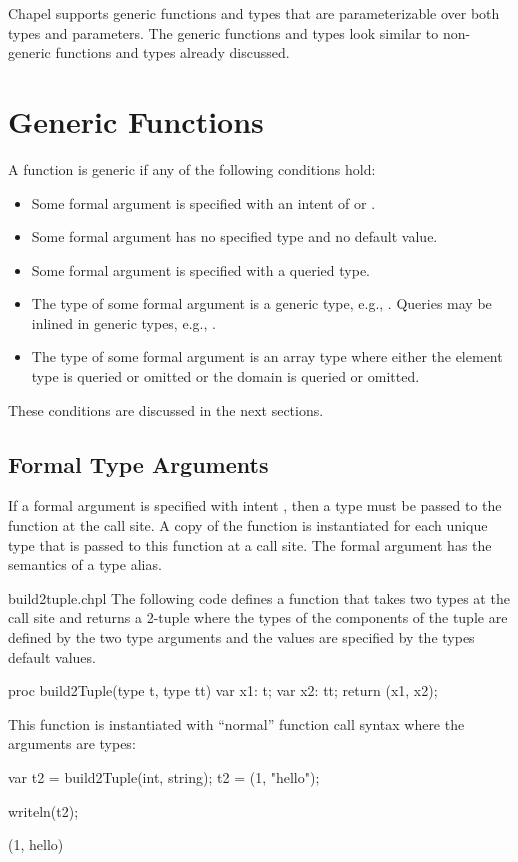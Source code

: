 \label{Generics}

Chapel supports generic functions and types that are parameterizable
over both types and parameters.  The generic functions and types look
similar to non-generic functions and types already discussed.

\section{Generic Functions}
\label{Generic_Functions}

A function is generic if any of the following conditions hold:
\begin{itemize}
\item
Some formal argument is specified with an intent of  or
.
\item
Some formal argument has no specified type and no default value.
\item
Some formal argument is specified with a queried type.
\item
The type of some formal argument is a generic type, e.g., .
Queries may be inlined in generic types, e.g., .
\item
The type of some formal argument is an array type where either the
element type is queried or omitted or the domain is queried or
omitted.
\end{itemize}
These conditions are discussed in the next sections.

\subsection{Formal Type Arguments}
\label{Formal_Type_Arguments}

If a formal argument is specified with intent , then a type
must be passed to the function at the call site.  A copy of the
function is instantiated for each unique type that is passed to this
function at a call site.  The formal argument has the semantics of a
type alias.

\begin{chapelexample}{build2tuple.chpl}
The following code defines a function that takes two types at the call
site and returns a 2-tuple where the types of the components of the
tuple are defined by the two type arguments and the values are
specified by the types default values.
\begin{chapel}
proc build2Tuple(type t, type tt) {
  var x1: t;
  var x2: tt;
  return (x1, x2);
}
\end{chapel}
This function is instantiated with ``normal'' function call syntax
where the arguments are types:
\begin{chapel}
var t2 = build2Tuple(int, string);
t2 = (1, "hello");
\end{chapel}
\begin{chapelpost}
writeln(t2);
\end{chapelpost}
\begin{chapeloutput}
(1, hello)
\end{chapeloutput}
\end{chapelexample}

